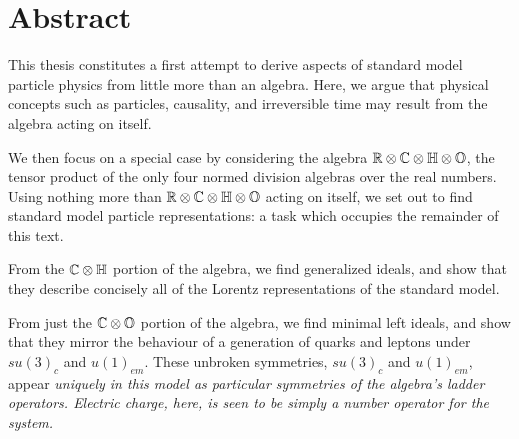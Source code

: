 \cleardoublepage %
 




  
  

\cleardoublepage


\section{Abstract}

This thesis constitutes a first attempt to derive aspects of standard  model particle physics from little more than an algebra.  Here, we argue that physical concepts such as particles, causality, and irreversible time may result from the algebra acting on itself.

We then focus on a special case by considering the algebra $\mathbb{R}\otimes\mathbb{C}\otimes\mathbb{H}\otimes\mathbb{O}$, the tensor product of the only four normed division algebras over the real numbers.  Using nothing more than $\mathbb{R}\otimes\mathbb{C}\otimes\mathbb{H}\otimes\mathbb{O}$ acting on itself, we set out to find standard model particle representations:  a task which occupies the remainder of this text.


From the $\mathbb{C}\otimes\mathbb{H}$ portion of the algebra, we find generalized ideals, and show that they describe concisely all of the Lorentz representations of the standard model.

From just the $\mathbb{C}\otimes\mathbb{O}$ portion of the algebra, we find minimal left ideals, and show that they mirror the behaviour of a generation of  quarks and leptons under $su(3)_c$ and $u(1)_{em}$.  These unbroken symmetries, $su(3)_c$ and $u(1)_{em}$, appear \it uniquely \rm in this model as particular symmetries of  the algebra's ladder operators.  Electric charge, here, is seen to be simply a number operator for the system.

